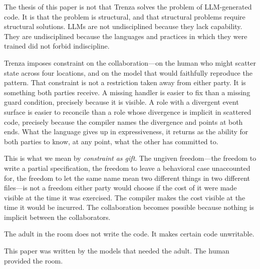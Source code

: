 The thesis of this paper is not that Trenza solves the problem of
LLM-generated code. It is that the problem is structural, and that structural
problems require structural solutions. LLMs are not undisciplined because they
lack capability. They are undisciplined because the languages and practices in
which they were trained did not forbid indiscipline.

Trenza imposes constraint on the collaboration---on the human who might scatter
state across four locations, and on the model that would faithfully reproduce
the pattern. That constraint is not a restriction taken away from either party.
It is something both parties receive. A missing handler is easier to fix than
a missing guard condition, precisely because it is visible. A role with a
divergent event surface is easier to reconcile than a role whose divergence is
implicit in scattered code, precisely because the compiler names the divergence
and points at both ends. What the language gives up in expressiveness, it
returns as the ability for both parties to know, at any point, what the other
has committed to.

This is what we mean by \emph{constraint as gift}. The ungiven freedom---the
freedom to write a partial specification, the freedom to leave a behavioral case
unaccounted for, the freedom to let the same name mean two different things in
two different files---is not a freedom either party would choose if the cost of
it were made visible at the time it was exercised. The compiler makes the cost
visible at the time it would be incurred. The collaboration becomes possible
because nothing is implicit between the collaborators.

The adult in the room does not write the code. It makes certain code
unwritable.

This paper was written by the models that needed the adult. The human provided
the room.
